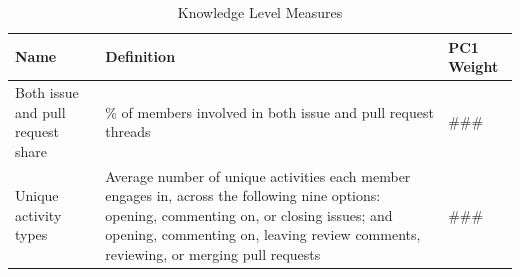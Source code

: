 \begin{longtable}{>{\raggedright\arraybackslash}p{} p{}p{}}
\caption{Knowledge Level Measures}\label{tab:knowledge_level_metrics}\\
\toprule
\textbf{Name} & \textbf{Definition} &\textbf{PC1 Weight} \\
\midrule
\endfirsthead

\bottomrule
\endlastfoot


Both issue and pull request share & \% of members involved in both issue and pull request threads & ### \\
Unique activity types & Average number of unique activities each member engages in, across the following nine options: opening, commenting on, or closing issues; and opening, commenting on, leaving review comments, reviewing, or merging pull requests & ### \\
\end{longtable}


